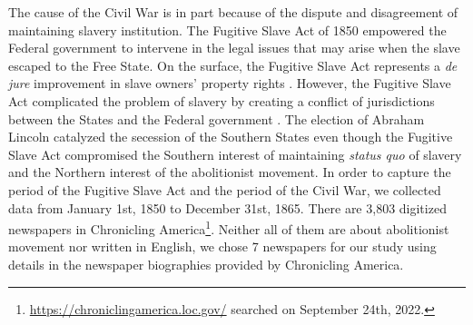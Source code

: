 \documentclass[11pt]{article}
\begin{document}
The cause of the Civil War is in part because of the dispute and disagreement of maintaining slavery institution. 
The Fugitive Slave Act of 1850 empowered the Federal government to intervene in the legal issues that may arise when the slave escaped to the Free State. 
On the surface, the Fugitive Slave Act represents a \textit{de jure} improvement in slave owners’ property rights \citep{lennon_slave_2016}. 
However, the Fugitive Slave Act complicated the problem of slavery by creating a conflict of jurisdictions between the States  and the Federal government \citep{baumgartner_enforcing_2022}. 
The election of Abraham Lincoln catalyzed the secession of the Southern States even though the Fugitive Slave Act compromised the Southern interest of maintaining \textit{status quo} of slavery and the Northern interest of the abolitionist movement. 
In order to capture the period of the Fugitive Slave Act and the period of the Civil War, we collected data from January 1st, 1850 to December 31st, 1865.
There are 3,803 digitized newspapers in Chronicling America\footnote{\url{https://chroniclingamerica.loc.gov/} searched on September 24th, 2022.}.
Neither all of them are about abolitionist movement nor written in English, we chose 7 newspapers for our study using details in the newspaper biographies provided by Chronicling America.
\end{document}
